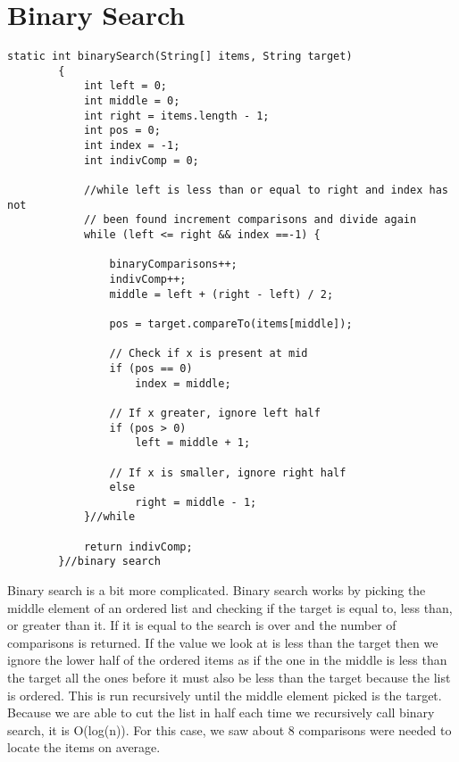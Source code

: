 \documentclass{article}
\begin{document}
\section{Binary Search}
\begin{lstlisting}[frame =single,
backgroundcolor = \color{grey!12}]
	  static int binarySearch(String[] items, String target)
	    {
	        int left = 0;
	        int middle = 0;
	        int right = items.length - 1;
	        int pos = 0;
	        int index = -1;
	        int indivComp = 0;
	        
	        //while left is less than or equal to right and index has not
	        // been found increment comparisons and divide again
	        while (left <= right && index ==-1) {
	        	
	        	binaryComparisons++;
	        	indivComp++;
	            middle = left + (right - left) / 2;
	 
	            pos = target.compareTo(items[middle]);
	 
	            // Check if x is present at mid
	            if (pos == 0)
	                index = middle;
	 
	            // If x greater, ignore left half
	            if (pos > 0)
	                left = middle + 1;
	 
	            // If x is smaller, ignore right half
	            else
	                right = middle - 1;
	        }//while
	 
	        return indivComp;
	    }//binary search
\end{lstlisting}
\large
Binary search is a bit more complicated. Binary search works by picking the middle element of an ordered list and checking if the target is equal to, less than, or greater than it. If it is equal to the search is over and the number of comparisons is returned. If the value we look at is less than the target then we ignore the lower half of the ordered items as if the one in the middle is less than the target all the ones before it must also be less than the target because the list is ordered. This is run recursively until the middle element picked is the target. Because we are able to cut the list in half each time we recursively call binary search, it is O(log(n)). For this case, we saw about 8 comparisons were needed to locate the items on average. 

\small
\end{document}
